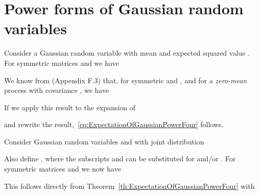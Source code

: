 \documentclass[twocolumn]{autart}
\begin{document}
\section{Power forms of Gaussian random variables} \label{s:GaussianPowerForms}

\begin{thm}\label{th:ExpectationOfGaussianPowerFour}
Consider a Gaussian random variable  with mean  and expected squared value . For symmetric matrices  and  we have

\end{thm}
\begin{pf}
We know from \cite{SCEMBook} (Appendix F.3) that, for symmetric  and , and for a \emph{zero-mean} process  with covariance , we have

If we apply this result to the expansion of

and rewrite the result,~\eqref{eq:ExpectationOfGaussianPowerFour} follows.
\end{pf}

\begin{thm}\label{th:ExpectationOfDifferentGaussianPowerFour}
Consider Gaussian random variables  and  with joint distribution

Also define , where the subscripts  and  can be substituted for  and/or . For symmetric matrices  and  we now have

\end{thm}
\begin{pf}
This follows directly from Theorem~\ref{th:ExpectationOfGaussianPowerFour} with

\end{pf}

        

\end{document}
